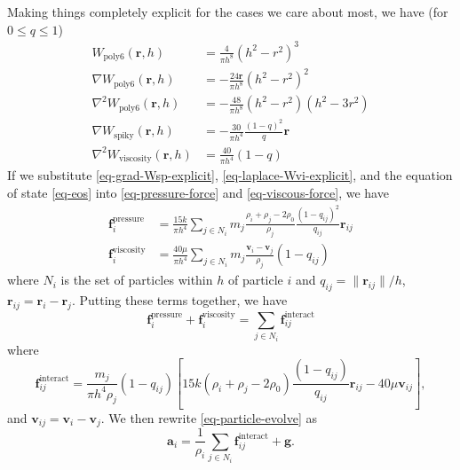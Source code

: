 \documentclass[10pt, leqno]{article} %
\newcommand{\bfr}{\mathbf{r}}
\newcommand{\bfv}{\mathbf{v}}
\newcommand{\bfa}{\mathbf{a}}
\newcommand{\bff}{\mathbf{f}}
\newcommand{\bfg}{\mathbf{g}}
\newcommand{\Wps}{W_{\mathrm{poly6}}}
\newcommand{\Wsp}{W_{\mathrm{spiky}}}
\newcommand{\Wvi}{W_{\mathrm{viscosity}}}
\begin{document}
Making things completely explicit for the cases we care about most, 
we have (for $0 \leq q \leq 1$)
\begin{align}
  \Wps(\bfr, h) 
    &= \frac{4}{\pi h^8} (h^2-r^2)^3 
    \label{eq-Wps-explicit} \\
  \nabla \Wps(\bfr, h) 
    &= -\frac{24 \bfr}{\pi h^8} (h^2-r^2)^2
    \label{eq-grad-Wps-explicit} \\
  \nabla^2 \Wps(\bfr, h) 
    &= -\frac{48}{\pi h^8} (h^2-r^2)(h^2-3r^2)
    \label{eq-laplace-Wps-explicit} \\
  \nabla \Wsp(\bfr, h) 
    &= -\frac{30}{\pi h^4} \frac{(1-q)^2}{q} \bfr
    \label{eq-grad-Wsp-explicit} \\
  \nabla^2 \Wvi(\bfr, h)
    &= \frac{40}{\pi h^4} (1-q)
   \label{eq-laplace-Wvi-explicit}
\end{align}
If we substitute \eqref{eq-grad-Wsp-explicit}, \eqref{eq-laplace-Wvi-explicit},
and the equation of state \eqref{eq-eos} into 
\eqref{eq-pressure-force} and \eqref{eq-viscous-force}, we have
\begin{align*}
  \bff_i^{\mathrm{pressure}}  &= 
    \frac{15k}{\pi h^4} \sum_{j \in N_i} m_j 
    \frac{\rho_i+\rho_j-2\rho_0}{\rho_j} \frac{(1-q_{ij})^2}{q_{ij}} \bfr_{ij} \\
  \bff_i^{\mathrm{viscosity}} &=
    \frac{40 \mu}{\pi h^4} \sum_{j \in N_i} m_j 
    \frac{\bfv_i-\bfv_j}{\rho_j} (1-q_{ij})
\end{align*}
where $N_i$ is the set of particles within $h$ of particle $i$ and
$q_{ij} = \|\bfr_{ij}\|/h$, $\bfr_{ij} = \bfr_i-\bfr_j$.
Putting these terms together, we have
\[
  \bff_i^{\mathrm{pressure}} + \bff_i^{\mathrm{viscosity}} =
    \sum_{j \in N_i} \bff_{ij}^{\mathrm{interact}}
\]
where
\[
  \bff_{ij}^{\mathrm{interact}} =
  \frac{m_j}{\pi h^4 \rho_j} (1-q_{ij}) \left[
    15k (\rho_i + \rho_j - 2 \rho_0) \frac{(1-q_{ij})}{q_{ij}} \bfr_{ij} -
    40\mu \bfv_{ij}
  \right],
\]
and $\bfv_{ij} = \bfv_i - \bfv_j$.  We then rewrite \eqref{eq-particle-evolve}
as
\[
  \bfa_i = \frac{1}{\rho_i} \sum_{j \in N_i} \bff_{ij}^{\mathrm{interact}} + \bfg.
\]


\end{document}

